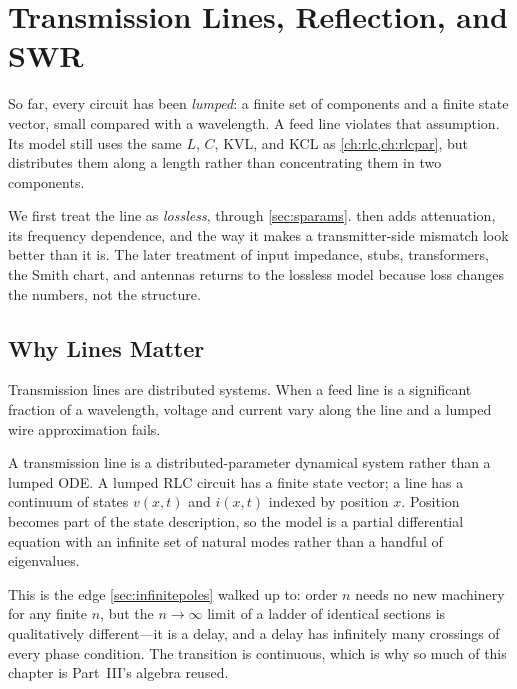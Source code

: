 \chapter{Transmission Lines, Reflection, and SWR}
\label{ch:lines}
So far, every circuit has been \emph{lumped}: a finite set of components and a
finite state vector, small compared with a wavelength. A feed line violates that
assumption. Its model still uses the same \(L\), \(C\), KVL, and KCL as
\cref{ch:rlc,ch:rlcpar}, but distributes them along a length rather than
concentrating them in two components.

We first treat the line as \emph{lossless}, through \cref{sec:sparams}.
 then adds attenuation, its frequency dependence, and the way it
makes a transmitter-side mismatch look better than it is. The later treatment of
input impedance, stubs, transformers, the Smith chart, and antennas returns to the
lossless model because loss changes the numbers, not the structure.

\section{Why Lines Matter}
Transmission lines are distributed systems. When a feed line is a significant
fraction of a wavelength, voltage and current vary along the line and a lumped
wire approximation fails.

\begin{controlsbox}
A transmission line is a distributed-parameter dynamical system rather than a
lumped ODE. A lumped RLC circuit has a finite state vector; a line has a
continuum of states \(v(x,t)\) and \(i(x,t)\) indexed by position \(x\). Position
becomes part of the state description, so the model is a partial differential
equation with an infinite set of natural modes rather than a handful of
eigenvalues.

This is the edge \cref{sec:infinitepoles} walked up to: order \(n\) needs no new
machinery for any finite \(n\), but the \(n\to\infty\) limit of a ladder of
identical sections is qualitatively different---it is a delay, and a delay has
infinitely many crossings of every phase condition. The transition is continuous,
which is why so much of this chapter is Part~III's algebra reused.
\end{controlsbox}

